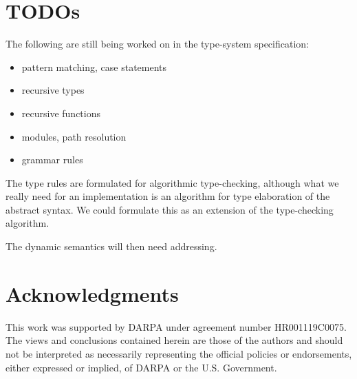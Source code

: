 \documentclass[letterpaper]{article}
\begin{document}
\section*{TODOs}

The following are still being worked on in the type-system
specification:
\begin{itemize}
\item pattern matching, case statements
\item recursive types
\item recursive functions
\item modules, path resolution
\item grammar rules
\end{itemize}

The type rules are formulated for algorithmic type-checking, although
what we really need for an implementation is an algorithm for type
elaboration of the abstract syntax.  We could formulate this as an
extension of the type-checking algorithm.

The dynamic semantics will then need addressing.

\section*{Acknowledgments}
This work was supported by DARPA under agreement number HR001119C0075.
The views and conclusions contained herein are those of the authors
and should not be interpreted as necessarily representing the official
policies or endorsements, either expressed or implied, of DARPA or the
U.S. Government.



\end{document}
